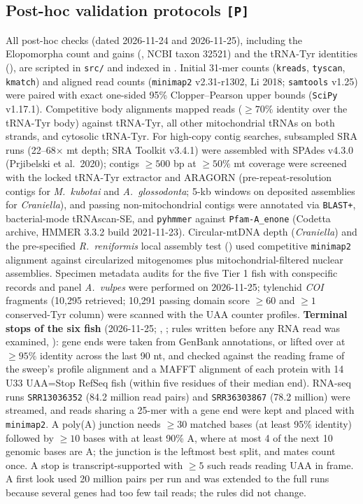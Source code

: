 \documentclass[11pt, a4paper]{article}
\begin{document}
\subsection{Post-hoc validation protocols \texttt{[P]}}
All post-hoc checks (dated 2026-11-24 and 2026-11-25), including the Elopomorpha count and gains (, NCBI taxon 32521) and the tRNA-Tyr identities (), are scripted in \texttt{src/} and indexed in . Initial 31-mer counts (\texttt{kreads}, \texttt{tyscan}, \texttt{kmatch}) and aligned read counts (\texttt{minimap2} v2.31-r1302, Li 2018; \texttt{samtools} v1.25) were paired with exact one-sided 95\% Clopper--Pearson upper bounds (\texttt{SciPy} v1.17.1). Competitive body alignments mapped reads ($\ge 70\%$ identity over the tRNA-Tyr body) against tRNA-Tyr, all other mitochondrial tRNAs on both strands, and cytosolic tRNA-Tyr. For high-copy contig searches, subsampled SRA runs (22--68$\times$ mt depth; SRA Toolkit v3.4.1) were assembled with SPAdes v4.3.0 (Prjibelski et al.\ 2020); contigs $\ge 500$ bp at $\ge 50\%$ mt coverage were screened with the locked tRNA-Tyr extractor and ARAGORN (pre-repeat-resolution contigs for \textit{M.\ kubotai} and \textit{A.\ glossodonta}; 5-kb windows on deposited assemblies for \textit{Craniella}), and passing non-mitochondrial contigs were annotated via \texttt{BLAST+}, bacterial-mode tRNAscan-SE, and \texttt{pyhmmer} against \texttt{Pfam-A\_enone} (Codetta archive, HMMER 3.3.2 build 2021-11-23). Circular-mtDNA depth (\textit{Craniella}) and the pre-specified \textit{R.\ reniformis} local assembly test () used competitive \texttt{minimap2} alignment against circularized mitogenomes plus mitochondrial-filtered nuclear assemblies. Specimen metadata audits for the five Tier 1 fish with conspecific records and panel \textit{A.\ vulpes} were performed on 2026-11-25; tylenchid \textit{COI} fragments (10,295 retrieved; 10,291 passing domain score $\ge 60$ and $\ge 1$ conserved-Tyr column) were scanned with the UAA counter profiles. \textbf{Terminal stops of the six fish} (2026-11-25; , ; rules written before any RNA read was examined, ): gene ends were taken from GenBank annotations, or lifted over at $\ge 95\%$ identity across the last 90 nt, and checked against the reading frame of the sweep's profile alignment and a MAFFT alignment of each protein with 14 U33 UAA=Stop RefSeq fish (within five residues of their median end). RNA-seq runs \texttt{SRR13036352} (84.2 million read pairs) and \texttt{SRR36303867} (78.2 million) were streamed, and reads sharing a 25-mer with a gene end were kept and placed with \texttt{minimap2}. A poly(A) junction needs $\ge 30$ matched bases (at least 95\% identity) followed by $\ge 10$ bases with at least 90\% A, where at most 4 of the next 10 genomic bases are A; the junction is the leftmost best split, and mates count once. A stop is transcript-supported with $\ge 5$ such reads reading UAA in frame. A first look used 20 million pairs per run and was extended to the full runs because several genes had too few tail reads; the rules did not change.
\end{document}

